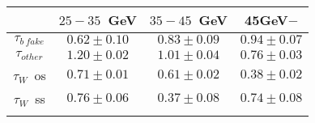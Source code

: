 \centering
\begin{tabular}{cccc} \toprule\toprule
 & $25-35$~GeV & $35-45$~GeV & 45GeV$-$\\\midrule
$\tau_{b~fake}$ & $0.62\pm0.10$ & $0.83\pm0.09$ & $0.94\pm0.07$\\
$\tau_{other}$ & $1.20\pm0.02$ & $1.01\pm0.04$ & $0.76\pm0.03$\\
$\tau_{W}$~os & $0.71\pm0.01$ & $0.61\pm0.02$ & $0.38\pm0.02$\\
$\tau_{W}$~ss & $0.76\pm0.06$ & $0.37\pm0.08$ & $0.74\pm0.08$\\
\bottomrule\bottomrule\\
\end{tabular}
